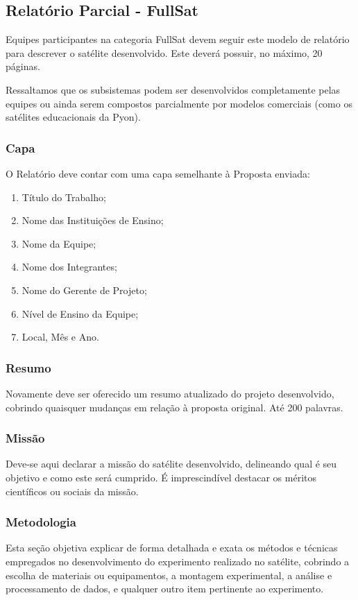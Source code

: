     \subsection{Relatório Parcial - FullSat}
        Equipes participantes na categoria FullSat devem seguir este modelo de relatório para descrever o satélite desenvolvido. Este deverá possuir, no máximo, 20 páginas.

        Ressaltamos que os subsistemas podem ser desenvolvidos completamente pelas equipes ou ainda serem compostos parcialmente por modelos comerciais (como os satélites educacionais da Pyon).
        
        \subsubsection{Capa}
            O Relatório deve contar com uma capa semelhante à Proposta enviada:
            \begin{enumerate}
                \item Título do Trabalho; 
                \item Nome das Instituições de Ensino; 
                \item Nome da Equipe; 
                \item Nome dos Integrantes; 
                \item Nome do Gerente de Projeto;
                \item Nível de Ensino da Equipe;
                \item Local, Mês e Ano. 
            \end{enumerate}
            
        \subsubsection{Resumo}
            Novamente deve ser oferecido um resumo atualizado do projeto desenvolvido, cobrindo quaisquer mudanças em relação à proposta original. Até 200 palavras.
        
        \subsubsection{Missão}
            Deve-se aqui declarar a missão do satélite desenvolvido, delineando qual é seu objetivo e como este será cumprido. É imprescindível destacar os méritos científicos ou sociais da missão.
        
        \subsubsection{Metodologia}
            Esta seção objetiva explicar de forma detalhada e exata os métodos e técnicas empregados no desenvolvimento do experimento realizado no satélite, cobrindo a escolha de materiais ou equipamentos, a montagem experimental, a análise e processamento de dados, e qualquer outro item pertinente ao experimento.


